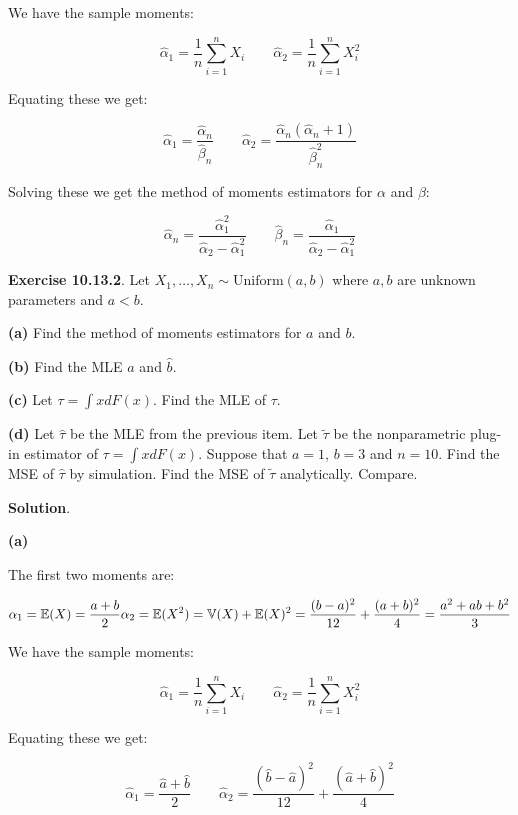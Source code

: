 We have the sample moments:

\[\hat{\alpha}_{1} = \frac{1}{n}\sum_{i=1}^{n} X_{i}
\quad \quad
\hat{\alpha}_{2} = \frac{1}{n}\sum_{i=1}^{n} X_{i}^{2}\]

Equating these we get:

\[
\hat{\alpha}_{1} = \frac{\hat{\alpha}_{n}}{\hat{\beta}_{n}}
\quad \quad
\hat{\alpha}_{2} = \frac{\hat{\alpha}_{n}(\hat{\alpha}_{n} + 1)}{\hat{\beta}_{n}^{2}}
\]

Solving these we get the method of moments estimators for \(\alpha\) and
\(\beta\):

\[
\hat{\alpha}_{n} = \frac{\hat{\alpha}_{1}^{2}}{\hat{\alpha}_{2} - \hat{\alpha}_{1}^{2}}
\quad \quad
\hat{\beta}_{n} = \frac{\hat{\alpha}_{1}}{\hat{\alpha}_{2} - \hat{\alpha}_{1}^{2}}
\]

\textbf{Exercise 10.13.2}. Let
\(X_{1}, \dots, X_{n} \sim \text{Uniform}(a, b)\) where \(a, b\) are unknown
parameters and \(a < b\).

\textbf{(a)} Find the method of moments estimators for \(a\) and \(b\).

\textbf{(b)} Find the MLE \(\hat{a}\) and \(\hat{b}\).

\textbf{(c)} Let \(\tau = \int x dF(x)\). Find the MLE of \(\tau\).

\textbf{(d)} Let \(\hat{\tau}\) be the MLE from the previous item. Let
\(\tilde{\tau}\) be the nonparametric plug-in estimator of
\(\tau = \int x dF(x)\). Suppose that \(a = 1\), \(b = 3\) and
\(n = 10\). Find the MSE of \(\hat{\tau}\) by simulation. Find the MSE
of \(\tilde{\tau}\) analytically. Compare.

\textbf{Solution}.

\textbf{(a)}

The first two moments are:

\[ 
\alpha_{1} = \mathbb{E}(X) = \frac{a + b}{2} \\
\alpha_{2} = \mathbb{E}(X^{2}) = \mathbb{V}(X) + \mathbb{E}(X)^{2} = \frac{(b - a)^{2}}{12} + \frac{(a + b)^{2}}{4}
= \frac{a^{2} + ab + b^{2}}{3}
\]

We have the sample moments:

\[\hat{\alpha}_{1} = \frac{1}{n}\sum_{i=1}^{n} X_{i}
\quad \quad
\hat{\alpha}_{2} = \frac{1}{n}\sum_{i=1}^{n} X_{i}^{2}\]

Equating these we get:

\[
\hat{\alpha}_{1} = \frac{\hat{a} + \hat{b}}{2}
\quad \quad
\hat{\alpha}_{2} = \frac{(\hat{b} - \hat{a})^{2}}{12} + \frac{(\hat{a} + \hat{b})^{2}}{4}
\]

